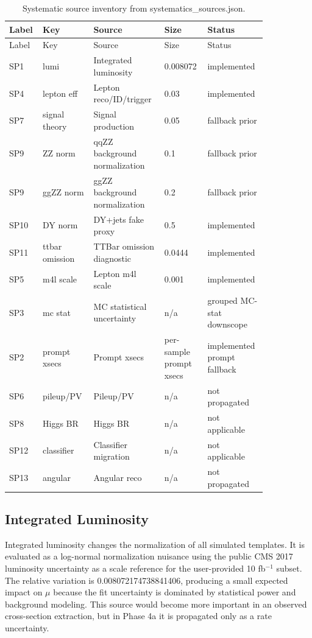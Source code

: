 \documentclass[11pt]{article}
\begin{document}
\begin{small}
\begin{longtable}{p{0.08\linewidth}p{0.18\linewidth}p{0.25\linewidth}p{0.13\linewidth}p{0.20\linewidth}}
\caption{Systematic source inventory from systematics\_sources.json.}\label{tab:syst-sources}\\
\toprule
Label & Key & Source & Size & Status \\ 
\midrule
\endfirsthead
\toprule
Label & Key & Source & Size & Status \\ 
\midrule
\endhead
SP1 & lumi & Integrated luminosity & 0.008072 & implemented \\
SP4 & lepton eff & Lepton reco/ID/trigger & 0.03 & implemented \\
SP7 & signal theory & Signal production & 0.05 & fallback prior \\
SP9 & ZZ norm & qqZZ background normalization & 0.1 & fallback prior \\
SP9 & ggZZ norm & ggZZ background normalization & 0.2 & fallback prior \\
SP10 & DY norm & DY+jets fake proxy & 0.5 & implemented \\
SP11 & ttbar omission & TTBar omission diagnostic & 0.0444 & implemented \\
SP5 & m4l scale & Lepton m4l scale & 0.001 & implemented \\
SP3 & mc stat & MC statistical uncertainty & n/a & grouped MC-stat downscope \\
SP2 & prompt xsecs & Prompt xsecs & per-sample prompt xsecs & implemented prompt fallback \\
SP6 & pileup/PV & Pileup/PV & n/a & not propagated \\
SP8 & Higgs BR & Higgs BR & n/a & not applicable \\
SP12 & classifier & Classifier migration & n/a & not applicable \\
SP13 & angular & Angular reco & n/a & not propagated \\
\bottomrule
\end{longtable}
\end{small}

\subsection{Integrated Luminosity}
Integrated luminosity changes the normalization of all simulated templates. It is evaluated as a log-normal normalization nuisance using the public CMS 2017 luminosity uncertainty as a scale reference for the user-provided 10 fb$^{-1}$ subset. The relative variation is 0.008072174738841406, producing a small expected impact on $\mu$ because the fit uncertainty is dominated by statistical power and background modeling. This source would become more important in an observed cross-section extraction, but in Phase 4a it is propagated only as a rate uncertainty.
\end{document}
